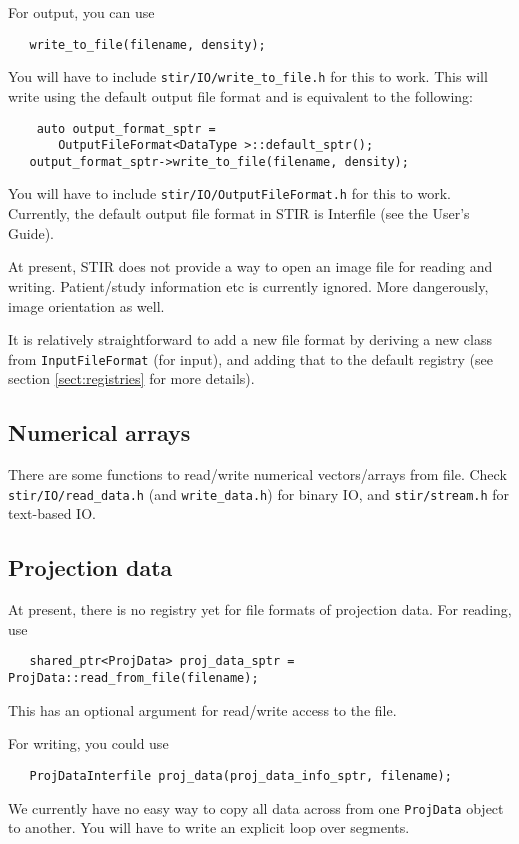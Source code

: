 \documentclass{article}
\begin{document}
For output, you can use
\begin{verbatim}
   write_to_file(filename, density);
\end{verbatim}
You will have to include \texttt{stir/IO/write\_to\_file.h} for this to work. This
will write using the default output file format and is equivalent to the following:
\begin{verbatim}
    auto output_format_sptr =
       OutputFileFormat<DataType >::default_sptr();
   output_format_sptr->write_to_file(filename, density);
\end{verbatim}
You will have to include \texttt{stir/IO/OutputFileFormat.h} for this to work.
Currently, the default output file format in STIR is Interfile (see the User's Guide).

At present, STIR does not provide a way to open an image file for reading and writing.
Patient/study information etc is currently ignored. More dangerously, image orientation
as well.

It is relatively straightforward to add a new file format by deriving a new class
from \texttt{InputFileFormat} (for input), and adding that to the default registry
(see section \ref{sect:registries} for more details).

\subsection{Numerical arrays}
There are some functions to read/write numerical vectors/arrays from
file. Check \texttt{stir/IO/read\_data.h} (and \texttt{write\_data.h}) for
binary IO, and \texttt{stir/stream.h} for text-based IO.

\subsection{Projection data}
At present, there is no registry yet for file formats of projection data. For reading, use
\begin{verbatim}
   shared_ptr<ProjData> proj_data_sptr = ProjData::read_from_file(filename);
\end{verbatim}
This has an optional argument for read/write access to the file.

For writing, you could use
\begin{verbatim}
   ProjDataInterfile proj_data(proj_data_info_sptr, filename);
\end{verbatim}
We currently have no easy way to copy all data across from one \texttt{ProjData}
object to another. You will have to write an explicit loop over segments.
\end{document}
